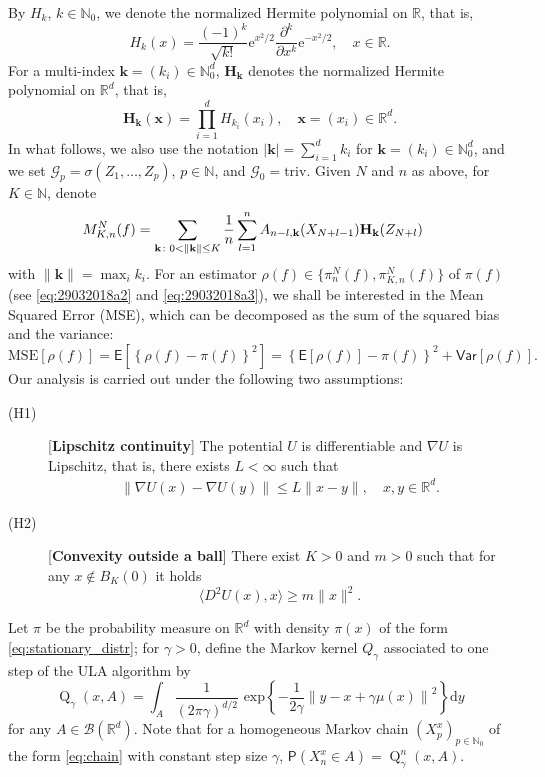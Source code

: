 \documentclass[bj]{imsart}
\def\PE{\mathsf{E}}
\def\PVar{\mathsf{Var}}
\newcommand{\ps}[2]{\langle #1, #2 \rangle}
\def\nset{\mathbb{N}}
\def\rset{\mathbb{R}}
\def\rmd{\mathrm{d}}
\def\rme{\mathrm{e}}
\def\rset{\mathbb{R}}
\def\kerULA{\operatorname{Q}}
\begin{document}
By $H_k$, $k\in\mathbb N_0$,
we denote the normalized Hermite polynomial on $\mathbb R$, that is,
$$
H_k(x)=\frac{(-1)^k}{\sqrt{k!}}\rme^{x^2/2}\frac{\partial^k}{\partial x^k}\rme^{-x^2/2},
\quad x\in\mathbb R.
$$
For a multi-index $\mathbf{k}=(k_i)\in\mathbb N_0^d$,
$\mathbf{H}_\mathbf{k}$ denotes the normalized Hermite polynomial on $\mathbb R^d$, that is,
$$
\mathbf{H}_\mathbf{k}(\mathbf{x})=\prod_{i=1}^d H_{k_i}(x_i),\quad \mathbf{x}=(x_i)\in\mathbb R^d.
$$
In what follows, we also use the notation
$|\mathbf{k}|=\sum_{i=1}^d k_i$ for $\mathbf{k}=(k_i)\in\mathbb N_0^d$,
and we set $\mathcal G_p=\sigma(Z_1,\ldots,Z_p)$, $p\in\mathbb N$, and $\mathcal G_0=\mathrm{triv}$.
Given $N$ and $n$ as above, for $K\in\mathbb N$, denote
\begin{align}
M_{K,n}^N(f) & =\sum_{\mathbf k\colon 0<\|\mathbf{k}\|\le K}\frac{1}{n}\sum_{l=1}^{n}A_{n-l,\mathbf{k}}(X_{N+l-1})\mathbf{H}_\mathbf{k}(Z_{N+l})
\label{eq:29032018a5}
\notag
\end{align}
with \(\|\mathbf{k}\|=\max_{i} k_i.\)
For an estimator $\rho(f)\in\{\pi_n^N(f),\pi_{K,n}^N(f)\}$
of $\pi(f)$ (see \eqref{eq:29032018a2} and \eqref{eq:29032018a3}), we shall be interested in the Mean Squared Error (MSE),
which can be decomposed as the sum of the squared  bias
and the  variance:
\begin{equation}
\label{eq:29032018a4}
\mathrm{MSE}\left[\rho(f)\right] = \PE\left[\left\{\rho(f)-\pi(f)\right\}^2\right]
=\left\{\PE[\rho(f)]-\pi(f)\right\}^2 +\PVar[\rho(f)].
\end{equation}
Our analysis is carried out under the following two assumptions:
\begin{description}
\item[(H1)][\textbf{Lipschitz continuity}] The potential $U$ is differentiable and $\nabla U$ is Lipschitz, that is, there exists $L < \infty$ such that
\begin{eqnarray*}
\| \nabla U(x)-\nabla U(y) \| \leq L \|x-y\|, \quad x,y\in \rset^d.
\end{eqnarray*}
\item[(H2)][\textbf{Convexity outside a ball}] There exist $K>0$ and $m>0$ such that for any $x\not\in B_{K}(0)$  it holds
\begin{equation*}
\ps{D^2U(x)}{x} \geq m\|x\|^2.
\end{equation*}
\end{description}
Let $\pi$ be the probability measure on $\rset^d$ with density $\pi(x)$ of the form \eqref{eq:stationary_distr};
for $\gamma>0$, define the Markov kernel $Q_\gamma$ associated to one step of the ULA algorithm by
\begin{equation}
\label{eq:ula_kernel}
\kerULA_{\gamma}(x,A)=\int_{A} \frac{1}{(2 \pi \gamma)^{d/2}} \text{ exp} \left\{ -\frac{1}{2\gamma} \left\| y - x + \gamma \mu(x)\right\|^2\right\} \rmd y
\end{equation}
for any $A \in \mathcal{B}(\rset^d)$. Note that for a homogeneous Markov chain $\left(X^x_{p}\right)_{p \in \nset_0}$ of the form \eqref{eq:chain} with constant step size $\gamma$, $\mathsf{P}(X_n^x \in A) = \kerULA^n_{\gamma}(x,A)$. 
\end{document}
